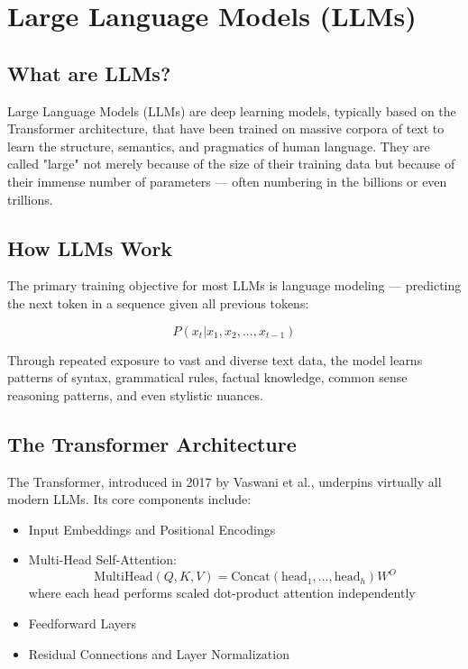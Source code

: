 \documentclass[openany]{book}
\begin{document}
\section{Large Language Models (LLMs)}

\subsection{What are LLMs?}
Large Language Models (LLMs) are deep learning models, typically based on the 
Transformer architecture, that have been trained on massive corpora of text to 
learn the structure, semantics, and pragmatics of human language. They are 
called "large" not merely because of the size of their training data but because 
of their immense number of parameters — often numbering in the billions or even 
trillions.

\subsection{How LLMs Work}
The primary training objective for most LLMs is language modeling — predicting 
the next token in a sequence given all previous tokens:

\begin{equation}
P(x_t | x_1, x_2, ..., x_{t-1})
\end{equation}

Through repeated exposure to vast and diverse text data, the model learns 
patterns of syntax, grammatical rules, factual knowledge, common sense reasoning 
patterns, and even stylistic nuances.

\subsection{The Transformer Architecture}
The Transformer, introduced in 2017 by Vaswani et al., underpins virtually all 
modern LLMs. Its core components include:

\begin{itemize}
    \item Input Embeddings and Positional Encodings
    \item Multi-Head Self-Attention:
    \begin{equation}
        \text{MultiHead}(Q, K, V) = \text{Concat}(\text{head}_1, ..., 
        \text{head}_h)W^O
    \end{equation}
    where each head performs scaled dot-product attention independently
    \item Feedforward Layers
    \item Residual Connections and Layer Normalization
\end{itemize}
\end{document}
